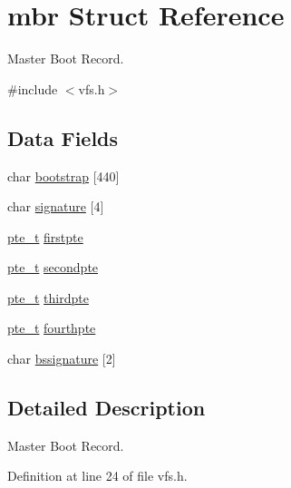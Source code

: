 \hypertarget{a00316}{}\section{mbr Struct Reference}
\label{a00316}


Master Boot Record.  




{\ttfamily \#include $<$vfs.\+h$>$}

\subsection*{Data Fields}
\begin{DoxyCompactItemize}
\item 
char \hyperlink{a00316_acd9201425a84fdd1d341c2d529494ab1_acd9201425a84fdd1d341c2d529494ab1}{bootstrap} \mbox{[}440\mbox{]}
\item 
char \hyperlink{a00316_a7a01b3c5837cdb118fdf778197aff57b_a7a01b3c5837cdb118fdf778197aff57b}{signature} \mbox{[}4\mbox{]}
\item 
\hyperlink{a00191_aeef6bb6b6bbfd4d912338e1e5c6938a5_aeef6bb6b6bbfd4d912338e1e5c6938a5}{pte\+\_\+t} \hyperlink{a00316_abd208d0cb66e336d565beb33de1b5056_abd208d0cb66e336d565beb33de1b5056}{firstpte}
\item 
\hyperlink{a00191_aeef6bb6b6bbfd4d912338e1e5c6938a5_aeef6bb6b6bbfd4d912338e1e5c6938a5}{pte\+\_\+t} \hyperlink{a00316_a6539d6c096872ae8ff274a277b2652a4_a6539d6c096872ae8ff274a277b2652a4}{secondpte}
\item 
\hyperlink{a00191_aeef6bb6b6bbfd4d912338e1e5c6938a5_aeef6bb6b6bbfd4d912338e1e5c6938a5}{pte\+\_\+t} \hyperlink{a00316_ace5aefce3038d09ee29fec72826eef97_ace5aefce3038d09ee29fec72826eef97}{thirdpte}
\item 
\hyperlink{a00191_aeef6bb6b6bbfd4d912338e1e5c6938a5_aeef6bb6b6bbfd4d912338e1e5c6938a5}{pte\+\_\+t} \hyperlink{a00316_ace1c3d3ab069c2620bc27f49168f1e6b_ace1c3d3ab069c2620bc27f49168f1e6b}{fourthpte}
\item 
char \hyperlink{a00316_a586361d132b342e9628f1079ad7b4b8d_a586361d132b342e9628f1079ad7b4b8d}{bssignature} \mbox{[}2\mbox{]}
\end{DoxyCompactItemize}


\subsection{Detailed Description}
Master Boot Record. 

Definition at line 24 of file vfs.\+h.



